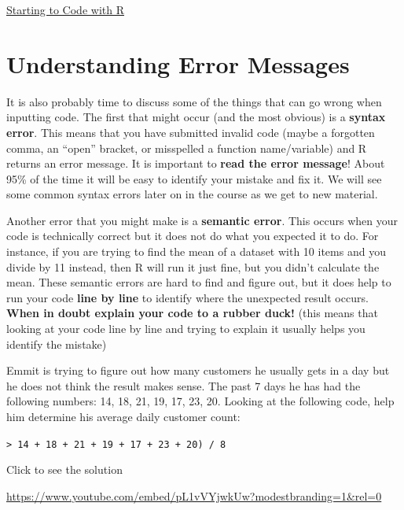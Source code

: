 \documentclass[
  letterpaper,
  DIV=11,
  numbers=noendperiod]{scrreprt}
\begin{document}
\begin{watch}{}{}
    \href{https://youtu.be/Wf7Qwbr9Nko}{Starting to Code with R}
\end{watch}

\section{Understanding Error
Messages}\label{understanding-error-messages}

It is also probably time to discuss some of the things that can go wrong
when inputting code. The first that might occur (and the most obvious)
is a \textbf{syntax error}. This means that you have submitted invalid
code (maybe a forgotten comma, an ``open'' bracket, or misspelled a
function name/variable) and R returns an error message. It is important
to \textbf{read the error message}! About 95\% of the time it will be
easy to identify your mistake and fix it. We will see some common syntax
errors later on in the course as we get to new material.

Another error that you might make is a \textbf{semantic error}. This
occurs when your code is technically correct but it does not do what you
expected it to do. For instance, if you are trying to find the mean of a
dataset with 10 items and you divide by 11 instead, then R will run it
just fine, but you didn't calculate the mean. These semantic errors are
hard to find and figure out, but it does help to run your code
\textbf{line by line} to identify where the unexpected result occurs.
\textbf{When in doubt explain your code to a rubber duck!} (this means
that looking at your code line by line and trying to explain it usually
helps you identify the mistake)

\begin{tcolorbox}[enhanced jigsaw, colframe=quarto-callout-tip-color-frame, colback=white, breakable, rightrule=.15mm, title=\textcolor{quarto-callout-tip-color}{\faLightbulb}\hspace{0.5em}{Try it Out}, bottomtitle=1mm, toptitle=1mm, titlerule=0mm, left=2mm, coltitle=black, colbacktitle=quarto-callout-tip-color!10!white, leftrule=.75mm, opacitybacktitle=0.6, bottomrule=.15mm, opacityback=0, arc=.35mm, toprule=.15mm]

Emmit is trying to figure out how many customers he usually gets in a
day but he does not think the result makes sense. The past 7 days he has
had the following numbers: 14, 18, 21, 19, 17, 23, 20. Looking at the
following code, help him determine his average daily customer count:

\texttt{\textgreater{}\ 14\ +\ 18\ +\ 21\ +\ 19\ +\ 17\ +\ 23\ +\ 20)\ /\ 8}

Click to see the solution

\url{https://www.youtube.com/embed/pL1vVYjwkUw?modestbranding=1&rel=0}

\end{tcolorbox}
\end{document}
